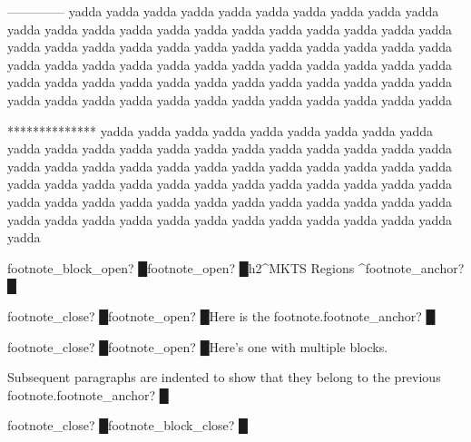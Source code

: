 \begin{multicols}{2}
--------------
yadda yadda yadda yadda yadda yadda yadda yadda yadda yadda
yadda yadda yadda yadda yadda yadda yadda yadda yadda yadda
yadda yadda yadda yadda yadda yadda yadda yadda yadda yadda
yadda yadda yadda yadda yadda yadda yadda yadda yadda yadda
yadda yadda yadda yadda yadda yadda yadda yadda yadda yadda
yadda yadda yadda yadda yadda yadda yadda yadda yadda yadda
yadda yadda yadda yadda yadda yadda yadda yadda yadda yadda\mktsShowpar\par

**************
yadda yadda yadda yadda yadda yadda yadda yadda yadda yadda
yadda yadda yadda yadda yadda yadda yadda yadda yadda yadda
yadda yadda yadda yadda yadda yadda yadda yadda yadda yadda
yadda yadda yadda yadda yadda yadda yadda yadda yadda yadda
yadda yadda yadda yadda yadda yadda yadda yadda yadda yadda
yadda yadda yadda yadda yadda yadda yadda yadda yadda yadda
yadda yadda yadda yadda yadda yadda yadda yadda yadda yadda\mktsShowpar\par
{\mktsStyleBold\color{violet}{\mktsStyleSymbol}footnote\_block\_open? {\mktsStyleSymbol█}}{\mktsStyleBold\color{violet}{\mktsStyleSymbol}footnote\_open? {\mktsStyleSymbol█}}h2\textasciicircum{}{\mktsStyleBold{}MKTS} Regions \textasciicircum{}{\mktsStyleBold\color{violet}{\mktsStyleSymbol}footnote\_anchor? {\mktsStyleSymbol█}}\mktsShowpar\par
{\mktsStyleBold\color{violet}{\mktsStyleSymbol}footnote\_close? {\mktsStyleSymbol█}}{\mktsStyleBold\color{violet}{\mktsStyleSymbol}footnote\_open? {\mktsStyleSymbol█}}Here is the footnote.{\mktsStyleBold\color{violet}{\mktsStyleSymbol}footnote\_anchor? {\mktsStyleSymbol█}}\mktsShowpar\par
{\mktsStyleBold\color{violet}{\mktsStyleSymbol}footnote\_close? {\mktsStyleSymbol█}}{\mktsStyleBold\color{violet}{\mktsStyleSymbol}footnote\_open? {\mktsStyleSymbol█}}Here’s one with multiple blocks.\mktsShowpar\par
Subsequent paragraphs are indented to show that they
belong to the previous footnote.{\mktsStyleBold\color{violet}{\mktsStyleSymbol}footnote\_anchor? {\mktsStyleSymbol█}}\mktsShowpar\par
{\mktsStyleBold\color{violet}{\mktsStyleSymbol}footnote\_close? {\mktsStyleSymbol█}}{\mktsStyleBold\color{violet}{\mktsStyleSymbol}footnote\_block\_close? {\mktsStyleSymbol█}}\end{multicols}
